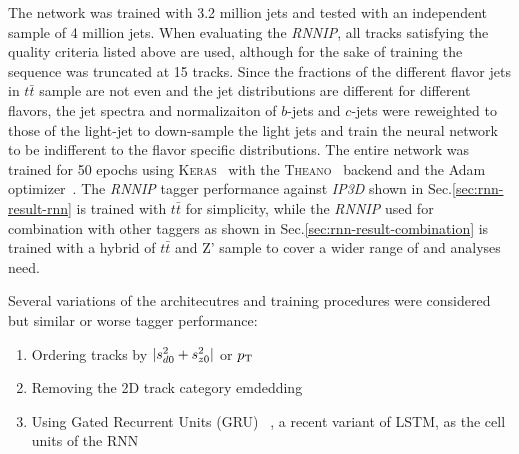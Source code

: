 The network was trained with 3.2 million jets and tested with an independent sample of 4 million jets. When evaluating the \textit{RNNIP}, all tracks satisfying the quality criteria listed above are used, although for the sake of training the sequence was truncated at 15 tracks. Since the fractions of the different flavor jets in $t\bar t$ sample are not even and the jet \pt distributions are different for different flavors, the jet \pt spectra and normalizaiton of $b$-jets and $c$-jets were reweighted to those of the light-jet to down-sample the light jets and train the neural network to be indifferent to the flavor specific \pt distributions. The entire network was trained for 50 epochs using \textsc{Keras}~\cite{keras} with the \textsc{Theano}~\cite{theano} backend and the Adam optimizer~\cite{ref:ADAM}. The \textit{RNNIP} tagger performance against \textit{IP3D} shown in Sec.\ref{sec:rnn-result-rnn} is trained with $t\bar{t}$ for simplicity, while the \textit{RNNIP} used for combination with other taggers as shown in Sec.\ref{sec:rnn-result-combination} is trained with a hybrid of $t\bar{t}$ and Z' sample to cover a wider range of \pt and analyses need.

Several variations of the architecutres and training procedures were considered but similar or worse tagger performance:
\begin{enumerate}
\item Ordering tracks by $|s_{d0}^2 + s_{z0}^2|$ or $p_{{\rm T}}$
\item Removing the 2D track category emdedding
\item Using Gated Recurrent Units (GRU) ~\cite{ref:GRU,cho14}, a recent variant of LSTM, as the cell units of the RNN
 
\end{enumerate}

